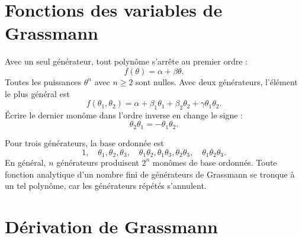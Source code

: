 \section{Fonctions des variables de Grassmann}

Avec un seul générateur, tout polynôme s’arrête au premier ordre :
\begin{equation}
f(\theta)=\alpha+\beta\theta.
\end{equation}
Toutes les puissances \(\theta^n\) avec \(n\geq2\) sont nulles. Avec deux générateurs, l’élément le plus général est
\begin{equation}
f(\theta_1,\theta_2)
=\alpha+\beta_1\theta_1+\beta_2\theta_2
+\gamma\theta_1\theta_2.
\end{equation}
Écrire le dernier monôme dans l’ordre inverse en change le signe :
\begin{equation}
\theta_2\theta_1=-\theta_1\theta_2.
\end{equation}

\begin{classroomqa}
\end{classroomqa}

Pour trois générateurs, la base ordonnée est
\begin{equation}
1,\quad
\theta_1,\theta_2,\theta_3,\quad
\theta_1\theta_2,\theta_1\theta_3,\theta_2\theta_3,\quad
\theta_1\theta_2\theta_3.
\end{equation}
En général, \(n\) générateurs produisent \(2^n\) monômes de base ordonnés. Toute fonction analytique d’un nombre fini de générateurs de Grassmann se tronque à un tel polynôme, car les générateurs répétés s’annulent. 

\section{Dérivation de Grassmann}

